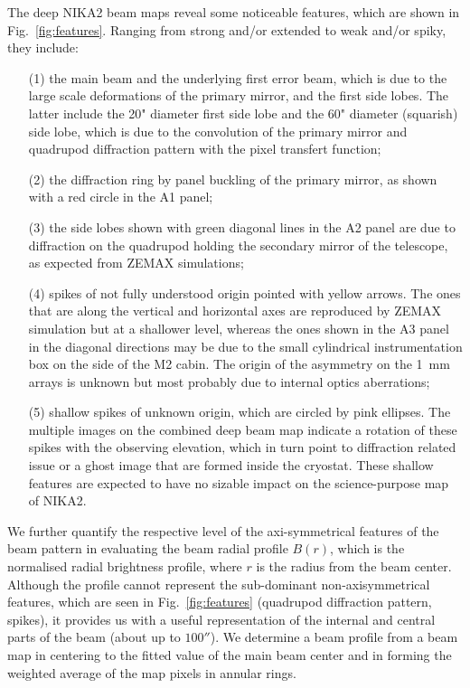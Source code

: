 The deep NIKA2 beam maps reveal some noticeable features, which are
shown in Fig.~\ref{fig:features}. Ranging from strong and/or extended to
weak and/or spiky, they include:
\begin{itemize}
\item[(1)] the main beam and the underlying first error
  beam, which is due to the large scale deformations of the primary
  mirror, and the first side lobes. The latter include 
  the 20" diameter first side lobe and the 60" diameter (squarish)
  side lobe, which is due to the convolution of the primary mirror and quadrupod
  diffraction pattern with the pixel transfert function;
\item[(2)] the diffraction ring by panel buckling of the primary
  mirror, as shown with a red circle in the A1 panel;
\item[(3)] the side lobes shown with green
  diagonal lines in the A2 panel are due to diffraction on the
  quadrupod holding the secondary mirror of the telescope, as expected
  from ZEMAX simulations;  
\item[(4)] spikes of not fully understood origin pointed with yellow
  arrows. The ones that are along the vertical and
  horizontal axes are reproduced by ZEMAX simulation but at a 
  shallower level, whereas the ones shown in the A3 panel in the
  diagonal directions may be due to the small cylindrical
  instrumentation box on the side of the M2 cabin. The origin of the
  asymmetry on the 1~mm arrays is unknown but most probably due to
  internal optics aberrations;
\item[(5)] shallow spikes of unknown origin, which are circled by pink
  ellipses. The multiple images on the combined deep beam map indicate
  a rotation of these spikes with the observing elevation, which in
  turn point to diffraction related issue or a ghost image that are
  formed inside the cryostat. These shallow features are expected to
  have no sizable impact on the science-purpose map of NIKA2.
\end{itemize}

We further quantify the respective level of the axi-symmetrical
features of the beam pattern in evaluating the beam radial profile
$B(r)$, which is the normalised radial brightness profile,
where $r$ is the radius from the beam center.
Although the profile cannot represent the sub-dominant non-axisymmetrical
features, which are seen in Fig.~\ref{fig:features} (quadrupod
diffraction pattern, spikes), it provides us with a useful
representation of the internal and central parts of the beam (about up to
$100''$). We determine a beam profile from a beam map in centering to
the fitted value of the main beam center and in forming the
weighted average of the map pixels in annular rings.

